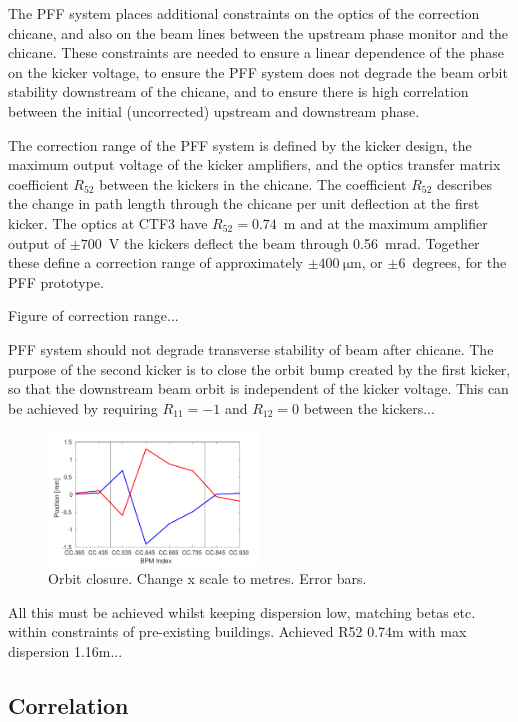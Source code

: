 \documentclass[%
 reprint,
 amsmath,amssymb,
 aps,
]{revtex4-1}
\begin{document}
The PFF system places additional constraints on the optics of the correction 
chicane, and also on the beam lines between the upstream phase monitor and the 
chicane. These constraints are needed to ensure a linear dependence of the 
phase on the kicker voltage, to ensure the PFF system does not degrade the beam 
orbit stability downstream of the chicane, and to ensure there is high 
correlation between the initial (uncorrected) upstream and downstream phase.

The correction range of the PFF system is defined by the kicker design, the 
maximum output voltage of the kicker amplifiers, and the optics transfer matrix 
coefficient \(R_{52}\) between the kickers in the chicane. The coefficient 
\(R_{52}\) describes the change in path length through the chicane per unit 
deflection at the first kicker. The optics at CTF3 have \(R_{52} = 0.74\)~m and 
at the maximum amplifier output 
of \(\pm700\)~V the kickers deflect the beam through 0.56~mrad. Together these 
define a correction range of approximately \(\pm400~\mathrm{\mu m}\), or 
\(\pm6\)~degrees, for the PFF 
prototype.

Figure of correction range...

PFF system should not degrade transverse stability of beam after chicane. The 
purpose of the second kicker is to close the orbit bump created by the first 
kicker, so that the downstream beam orbit is independent of the kicker voltage. 
This can be achieved by requiring \(R_{11}=-1\) and \(R_{12}=0\) between the 
kickers...

\begin{figure}
	\includegraphics[width=0.5\textwidth]{figs/orbClos}
	\caption{\label{fig:orbClos}Orbit closure. Change x scale to metres. Error 
	bars.}
\end{figure}

All this must be achieved whilst keeping dispersion low, matching betas etc. 
within constraints of pre-existing buildings. Achieved R52 0.74m with max 
dispersion 1.16m...

\subsection{\label{ss:r56} Correlation}
\end{document}
